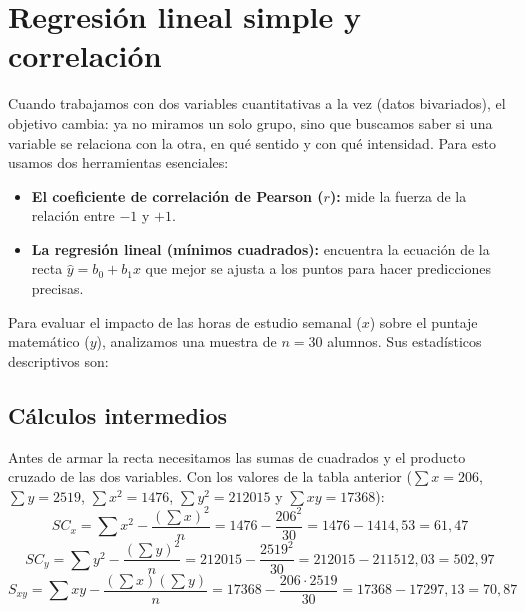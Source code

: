 \section{Regresión lineal simple y correlación}
Cuando trabajamos con dos variables cuantitativas a la vez (datos bivariados), el objetivo
cambia: ya no miramos un solo grupo, sino que buscamos saber si una variable se relaciona con
la otra, en qué sentido y con qué intensidad. Para esto usamos dos herramientas esenciales:
\begin{itemize}
  \item \textbf{El coeficiente de correlación de Pearson ($r$):} mide la fuerza de la relación    entre $-1$ y $+1$.
  \item \textbf{La regresión lineal (mínimos cuadrados):} encuentra la ecuación de la recta
    $\hat{y} = b_0 + b_1 x$ que mejor se ajusta a los puntos para hacer predicciones precisas.
\end{itemize}

\AnalisisDescriptivo
Para evaluar el impacto de las horas de estudio semanal ($x$) sobre el puntaje matemático
($y$), analizamos una muestra de $n = 30$ alumnos. Sus estadísticos descriptivos son:



\subsection{Cálculos intermedios}
Antes de armar la recta necesitamos las sumas de cuadrados y el producto cruzado de las dos
variables. Con los valores de la tabla anterior ($\sum x = 206$, $\sum y = 2519$,
$\sum x^2 = 1476$, $\sum y^2 = 212015$ y $\sum xy = 17368$):
\begin{equation*}
  SC_x = \sum x^2 - \frac{(\sum x)^2}{n} = 1476 - \frac{206^2}{30}
       = 1476 - 1414{,}53 = 61{,}47
\end{equation*}
\begin{equation*}
  SC_y = \sum y^2 - \frac{(\sum y)^2}{n} = 212015 - \frac{2519^2}{30}
       = 212015 - 211512{,}03 = 502{,}97
\end{equation*}
\begin{equation*}
  S_{xy} = \sum xy - \frac{(\sum x)(\sum y)}{n} = 17368 - \frac{206 \cdot 2519}{30}
         = 17368 - 17297{,}13 = 70{,}87
\end{equation*}


